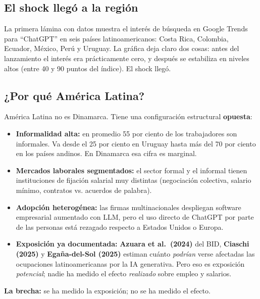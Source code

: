 \documentclass[12pt]{article}
\begin{document}
\subsection{El shock llegó a la región}

La primera lámina con datos muestra el interés de búsqueda en Google Trends para ``ChatGPT'' en seis países latinoamericanos: Costa Rica, Colombia, Ecuador, México, Perú y Uruguay. La gráfica deja claro dos cosas: antes del lanzamiento el interés era prácticamente cero, y después se estabiliza en niveles altos (entre 40 y 90 puntos del índice). El shock llegó.

\subsection{¿Por qué América Latina?}

América Latina no es Dinamarca. Tiene una configuración estructural \textbf{opuesta}:

\begin{itemize}
  \item \textbf{Informalidad alta:} en promedio 55 por ciento de los trabajadores son informales. Va desde el 25 por ciento en Uruguay hasta más del 70 por ciento en los países andinos. En Dinamarca esa cifra es marginal.
  \item \textbf{Mercados laborales segmentados:} el sector formal y el informal tienen instituciones de fijación salarial muy distintas (negociación colectiva, salario mínimo, contratos vs. acuerdos de palabra).
  \item \textbf{Adopción heterogénea:} las firmas multinacionales despliegan software empresarial aumentado con LLM, pero el uso directo de ChatGPT por parte de las personas está rezagado respecto a Estados Unidos o Europa.
  \item \textbf{Exposición ya documentada:} \textbf{Azuara et al.\ (2024)} del BID, \textbf{Ciaschi (2025)} y \textbf{Egaña-del-Sol (2025)} estiman cuánto \emph{podrían} verse afectadas las ocupaciones latinoamericanas por la IA generativa. Pero eso es exposición \emph{potencial}; nadie ha medido el efecto \emph{realizado} sobre empleo y salarios.
\end{itemize}

\begin{ideaclave}
\textbf{La brecha:} se ha medido la exposición; no se ha medido el efecto.
\end{ideaclave}

\end{document}
